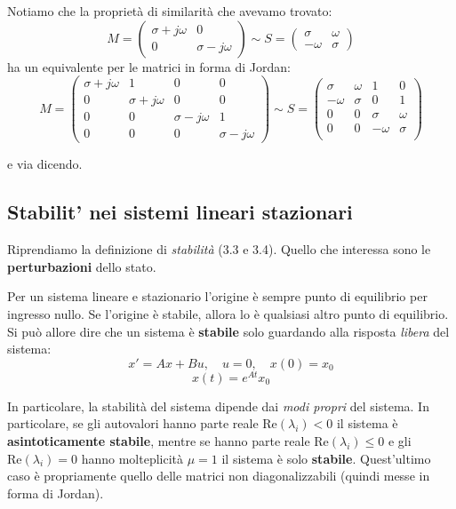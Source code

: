 \documentclass[a4paper,11pt]{article}
\begin{document}
\par\smallskip
Notiamo che la proprietà di similarità che avevamo trovato:
$$
M = \begin{pmatrix}
	\sigma + j\omega & 0 \\
	0 & \sigma - j\omega
\end{pmatrix}
\sim
S = \begin{pmatrix}
	\sigma & \omega \\
	-\omega & \sigma
\end{pmatrix}
$$
ha un equivalente per le matrici in forma di Jordan:
$$
M=
\begin{pmatrix}
	\sigma + j \omega & 1 & 0 & 0 \\
	0 & \sigma + j \omega & 0 & 0 \\
	0 & 0 & \sigma - j \omega & 1 \\
	0 & 0 & 0 & \sigma - j \omega
\end{pmatrix}
\sim 
S=
\begin{pmatrix}
	\sigma & \omega & 1 & 0 \\
	-\omega & \sigma & 0 & 1 \\
	0 & 0 & \sigma & \omega \\
	0 & 0 & -\omega & \sigma \\
\end{pmatrix}
$$

e via dicendo.

\subsection{Stabilit' nei sistemi lineari stazionari}
Riprendiamo la definizione di \textit{stabilità} (3.3 e 3.4).
Quello che interessa sono le \textbf{perturbazioni} dello stato.

Per un sistema lineare e stazionario l'origine è sempre punto di equilibrio per ingresso nullo.
Se l'origine è stabile, allora lo è qualsiasi altro punto di equilibrio.
Si può allore dire che un sistema è \textbf{stabile} solo guardando alla risposta \textit{libera} del sistema:
$$
x' = Ax + Bu, \quad u = 0, \quad x(0) = x_0
$$
$$
x(t) = e^{At}x_0
$$

In particolare, la stabilità del sistema dipende dai \textit{modi propri} del sistema.
In particolare, se gli autovalori hanno parte reale $\mathrm{Re}(\lambda_i) < 0$ il sistema è \textbf{asintoticamente stabile}, mentre se hanno parte reale $\mathrm{Re}(\lambda_i) \leq 0$ e gli $\mathrm{Re}(\lambda_i) = 0$ hanno molteplicità $\mu =1$ il sistema è solo \textbf{stabile}.
Quest'ultimo caso è propriamente quello delle matrici non diagonalizzabili (quindi messe in forma di Jordan).
\end{document}
